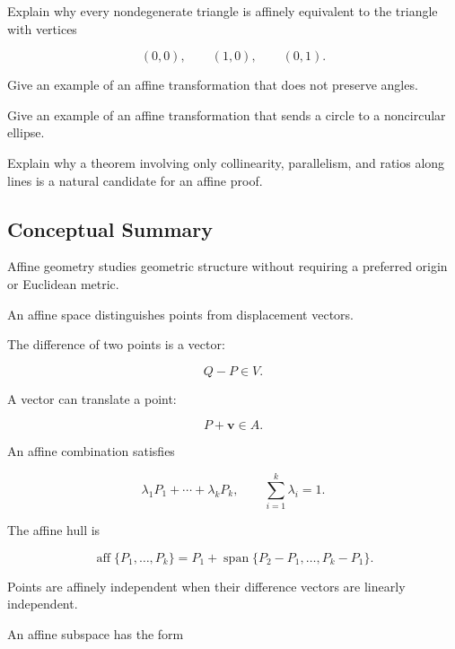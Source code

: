 \begin{exercise}[3]
Explain why every nondegenerate triangle is affinely equivalent to the
triangle with vertices

\[ (0,0),\qquad(1,0),\qquad(0,1). \]
\end{exercise}

\begin{exercise}[3]
Give an example of an affine transformation that does not preserve angles.
\end{exercise}

\begin{exercise}[3]
Give an example of an affine transformation that sends a circle to a
noncircular ellipse.
\end{exercise}

\begin{exercise}[3]
Explain why a theorem involving only collinearity, parallelism, and ratios
along lines is a natural candidate for an affine proof.
\end{exercise}

\subsection{Conceptual Summary}
\label{subsec:affine-geometry-summary}

Affine geometry studies geometric structure without requiring a preferred
origin or Euclidean metric.

An affine space distinguishes points from displacement vectors.

The difference of two points is a vector:

\[ \boxed{Q-P\in V.} \]

A vector can translate a point:

\[ \boxed{P+\mathbf{v}\in A.} \]

An affine combination satisfies

\[
\boxed{
\lambda_1P_1+\cdots+\lambda_kP_k,
\qquad
\sum_{i=1}^{k}\lambda_i=1.
}
\]

The affine hull is

\[
\boxed{
\operatorname{aff}\{P_1,\ldots,P_k\}
=
P_1+
\operatorname{span}\{P_2-P_1,\ldots,P_k-P_1\}.
}
\]

Points are affinely independent when their difference vectors are linearly
independent.

An affine subspace has the form

